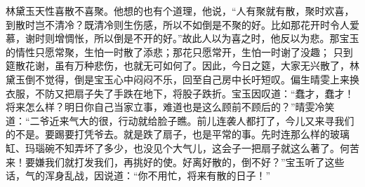 \begin{parag}
    林黛玉天性喜散不喜聚。他想的也有个道理，他说，“人有聚就有散，聚时欢喜，到散时岂不清冷？既清冷则生伤感，所以不如倒是不聚的好。比如那花开时令人爱慕，谢时则增惆怅，所以倒是不开的好。”故此人以为喜之时，他反以为悲。那宝玉的情性只愿常聚，生怕一时散了添悲；那花只愿常开，生怕一时谢了没趣； 只到筵散花谢，虽有万种悲伤，也就无可如何了。因此，今日之筵，大家无兴散了，林黛玉倒不觉得，倒是宝玉心中闷闷不乐，回至自己房中长吁短叹。偏生晴雯上来换衣服，不防又把扇子失了手跌在地下，将股子跌折。宝玉因叹道：“蠢才，蠢才！将来怎么样？明日你自己当家立事，难道也是这么顾前不顾后的？”晴雯冷笑 道：“二爷近来气大的很，行动就给脸子瞧。前儿连袭人都打了，今儿又来寻我们的不是。要踢要打凭爷去。就是跌了扇子，也是平常的事。先时连那么样的玻璃缸、玛瑙碗不知弄坏了多少，也没见个大气儿，这会子一把扇子就这么著了。何苦来！要嫌我们就打发我们，再挑好的使。好离好散的，倒不好？”宝玉听了这些话，气的浑身乱战，因说道：“你不用忙，将来有散的日子！”
\end{parag}



